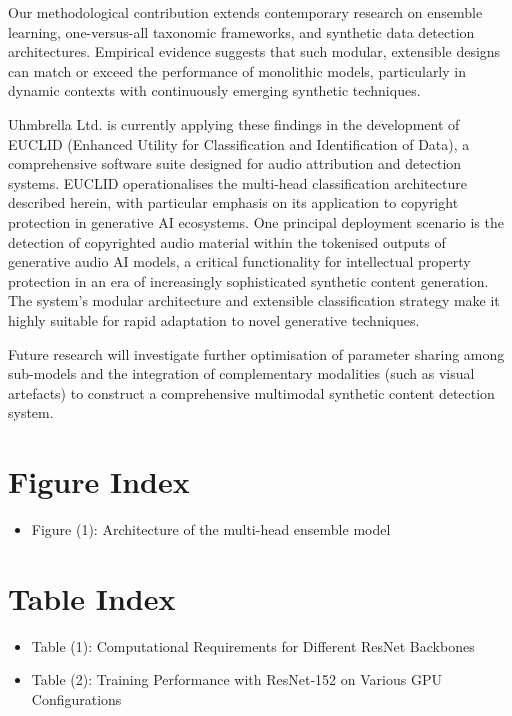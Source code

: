 \documentclass[conference]{IEEEtran}  %
\begin{document}
Our methodological contribution extends contemporary research on ensemble learning, one-versus-all taxonomic frameworks, and synthetic data detection architectures. Empirical evidence suggests that such modular, extensible designs can match or exceed the performance of monolithic models, particularly in dynamic contexts with continuously emerging synthetic techniques.

Uhmbrella Ltd. is currently applying these findings in the development of EUCLID (Enhanced Utility for Classification and Identification of Data), a comprehensive software suite designed for audio attribution and detection systems. EUCLID operationalises the multi-head classification architecture described herein, with particular emphasis on its application to copyright protection in generative AI ecosystems. One principal deployment scenario is the detection of copyrighted audio material within the tokenised outputs of generative audio AI models, a critical functionality for intellectual property protection in an era of increasingly sophisticated synthetic content generation. The system's modular architecture and extensible classification strategy make it highly suitable for rapid adaptation to novel generative techniques.

Future research will investigate further optimisation of parameter sharing among sub-models and the integration of complementary modalities (such as visual artefacts) to construct a comprehensive multimodal synthetic content detection system.




\section*{Figure Index}
\begin{itemize}
    \item Figure (1): Architecture of the multi-head ensemble model
\end{itemize}

\section*{Table Index}
\begin{itemize}
    \item Table (1): Computational Requirements for Different ResNet Backbones
    \item Table (2): Training Performance with ResNet-152 on Various GPU Configurations
\end{itemize}
\end{document}
